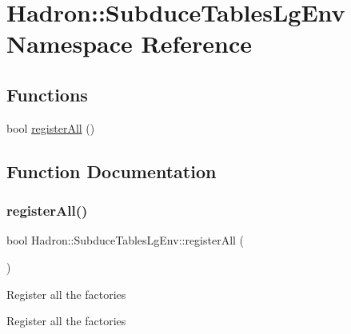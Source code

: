 \hypertarget{namespaceHadron_1_1SubduceTablesLgEnv}{}\section{Hadron\+:\+:Subduce\+Tables\+Lg\+Env Namespace Reference}
\label{namespaceHadron_1_1SubduceTablesLgEnv}
\subsection*{Functions}
\begin{DoxyCompactItemize}
\item 
bool \mbox{\hyperlink{namespaceHadron_1_1SubduceTablesLgEnv_abb63f9dacfb5b881f3052ce08000b859}{register\+All}} ()
\end{DoxyCompactItemize}


\subsection{Function Documentation}
\mbox{\label{namespaceHadron_1_1SubduceTablesLgEnv_abb63f9dacfb5b881f3052ce08000b859}} 
\subsubsection{\texorpdfstring{registerAll()}{registerAll()}}
{\footnotesize\ttfamily bool Hadron\+::\+Subduce\+Tables\+Lg\+Env\+::register\+All (\begin{DoxyParamCaption}{ }\end{DoxyParamCaption})}

Register all the factories

Register all the factories

